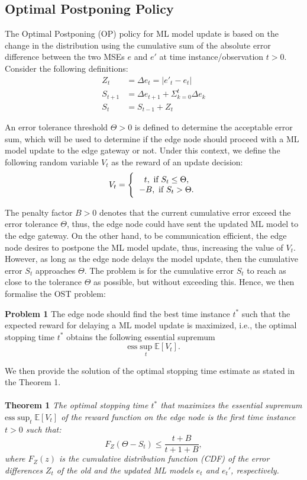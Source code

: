 \documentclass{mpaper}
\begin{document}
\subsection{Optimal Postponing Policy}
The Optimal Postponing (OP) policy for ML model update is based on the change in the distribution using the cumulative sum of the absolute error difference between the two MSEs $e$ and $e'$ at time instance/observation $t>0$. Consider the following definitions:
\begin{align}
    Z_t &= \Delta e_t = | e'_t - e_t |\\
    S_{t+1} &= \Delta e_{t+1} + \Sigma_{k=0}^t \Delta e_k\\
    S_t &= S_{t-1} + Z_t\label{eq:1}
\end{align}

An error tolerance threshold $\Theta > 0$ is defined to determine the acceptable error sum, which will be used to determine if the 
edge node should proceed with a ML model update to the edge gateway or not. Under this context, we define the following random variable $V_{t}$ as the reward of an update decision:
\begin{equation}\label{reward}
    V_t = \Bigg\{ \begin{tabular}{c}
                  $t,\ \text{if}\ S_t \leq \Theta$, \\
                  $-B,\ \text{if}\ S_t > \Theta.$
                  \end{tabular}
\end{equation}

The penalty factor $B> 0$ denotes that the current cumulative error exceed the error tolerance $\Theta$, thus, the edge node could have sent the updated ML model to the edge gateway. On the other hand, to be communication efficient, the edge node desires to postpone the ML model update, thus, increasing the value of $V_{t}$. However, as long as the edge node delays the model update, then the cumulative error $S_{t}$ approaches $\Theta$. The problem is for the cumulative error $S_{t}$ to reach as close to the tolerance $\Theta$ as possible, but without exceeding this. Hence, we then formalise the OST problem:

\textbf{Problem 1} The edge node should find the best time instance $t^{*}$ such that the expected reward for delaying a ML model update is maximized, i.e., the optimal stopping time $t^{*}$ obtains the following essential supremum
\[
\mbox{ess} \sup_{t} \mathbb{E}[V_{t}].
\]

We then provide the solution of the optimal stopping time estimate as stated in the Theorem 1.
\\
\\
\textbf{Theorem 1}\textit{
The optimal stopping time $t^{*}$ that maximizes the essential supremum $\mbox{ess} \sup_{t} \mathbb{E}[V_{t}]$ of the reward function on the edge node is the first time instance $t>0$ such that:
\[
F_{Z}(\Theta - S_{t}) \leq \frac{t+B}{t+1+B},
\]
where $F_{Z}(z)$ is the cumulative distribution function (CDF) of the error differences $Z_{t}$ of the old and the updated ML models $e_{t}$ and $e_{t}'$, respectively.}  
\\
\end{document}
